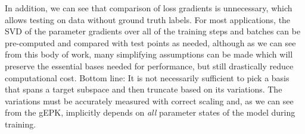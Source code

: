 In addition, we can see that comparison of loss gradients is unnecessary, which allows testing on data without ground truth labels. 
For most applications, the SVD of the parameter gradients over all of the training steps and batches can be pre-computed and compared with test points as needed, although as we can see from this body of work, many simplifying assumptions can be made which will preserve the essential bases needed for performance, but still drastically reduce computational cost. Bottom line: It is not necessarily sufficient to pick a basis that spans a target subspace and then truncate based on its variations. The variations must be accurately measured with correct scaling and, as we can see from the gEPK, implicitly depends on \emph{all} parameter states of the model during training. 





